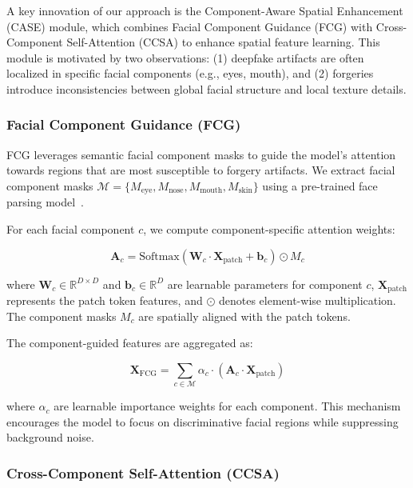 A key innovation of our approach is the Component-Aware Spatial Enhancement (CASE) module, which combines Facial Component Guidance (FCG) with Cross-Component Self-Attention (CCSA) to enhance spatial feature learning. This module is motivated by two observations: (1) deepfake artifacts are often localized in specific facial components (e.g., eyes, mouth), and (2) forgeries introduce inconsistencies between global facial structure and local texture details.

\subsubsection{Facial Component Guidance (FCG)}

FCG leverages semantic facial component masks to guide the model's attention towards regions that are most susceptible to forgery artifacts. We extract facial component masks $\mathcal{M} = \{M_{\text{eye}}, M_{\text{nose}}, M_{\text{mouth}}, M_{\text{skin}}\}$ using a pre-trained face parsing model~\cite{yu2018bisenet}.

For each facial component $c$, we compute component-specific attention weights:

\begin{equation}
\mathbf{A}_c = \text{Softmax}(\mathbf{W}_c \cdot \mathbf{X}_{\text{patch}} + \mathbf{b}_c) \odot M_c
\end{equation}

where $\mathbf{W}_c \in \mathbb{R}^{D \times D}$ and $\mathbf{b}_c \in \mathbb{R}^D$ are learnable parameters for component $c$, $\mathbf{X}_{\text{patch}}$ represents the patch token features, and $\odot$ denotes element-wise multiplication. The component masks $M_c$ are spatially aligned with the patch tokens.

The component-guided features are aggregated as:

\begin{equation}
\mathbf{X}_{\text{FCG}} = \sum_{c \in \mathcal{M}} \alpha_c \cdot (\mathbf{A}_c \cdot \mathbf{X}_{\text{patch}})
\end{equation}

where $\alpha_c$ are learnable importance weights for each component. This mechanism encourages the model to focus on discriminative facial regions while suppressing background noise.

\subsubsection{Cross-Component Self-Attention (CCSA)}

